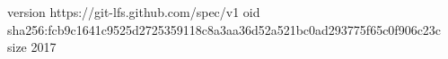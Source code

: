 version https://git-lfs.github.com/spec/v1
oid sha256:fcb9c1641c9525d2725359118c8a3aa36d52a521bc0ad293775f65c0f906c23c
size 2017
